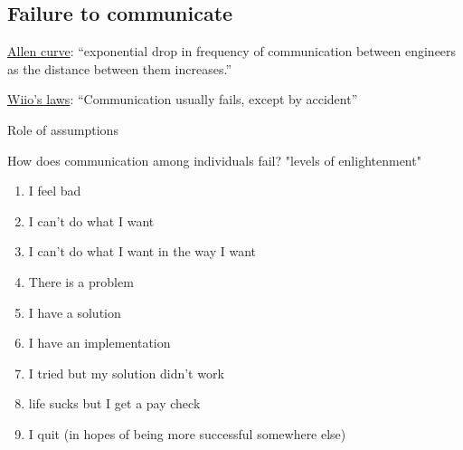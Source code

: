 \subsection{Failure to communicate}


\href{https://en.wikipedia.org/wiki/Allen_curve}{Allen curve}: ``exponential drop in frequency of communication between engineers as the distance between them increases.''

\href{https://en.wikipedia.org/wiki/Wiio\%27s_laws}{Wiio's laws}: ``Communication usually fails, except by accident''


Role of assumptions 

How does communication among individuals fail?
"levels of enlightenment"
\begin{enumerate}
    \item I feel bad
    \item I can't do what I want
    \item I can't do what I want in the way I want
    \item There is a problem
    \item I have a solution
    \item I have an implementation
    \item I tried but my solution didn't work
    \item life sucks but I get a pay check
    \item I quit (in hopes of being more successful somewhere else)
\end{enumerate}

